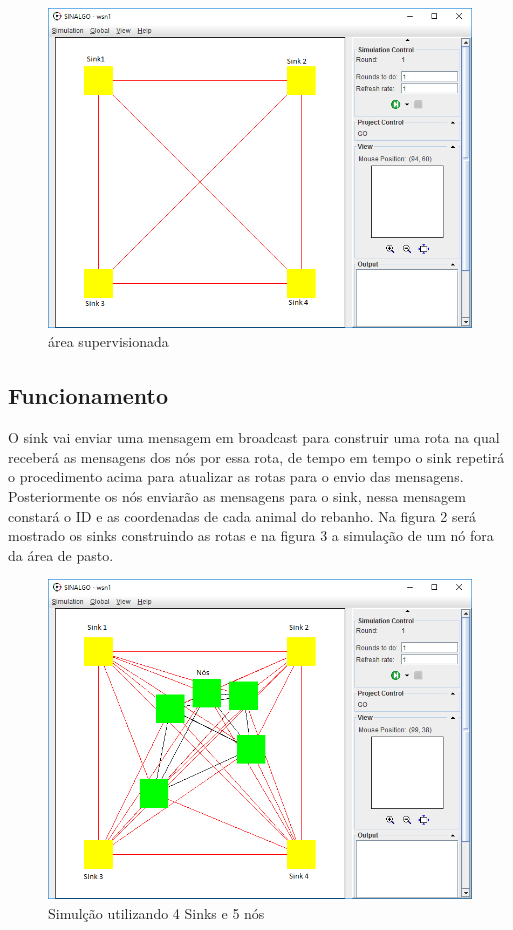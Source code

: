 \documentclass[12pt]{article}
\begin{document}
\begin{figure}[ht]
	\centering
	\includegraphics[scale=0.6]{Limite.png}
	\caption{área supervisionada}
	\label{Limite}
\end{figure}
\FloatBarrier 

\subsection{Funcionamento}

O sink vai enviar uma mensagem em broadcast para construir uma rota na qual receberá as mensagens dos nós por essa rota, de tempo em tempo o sink repetirá o procedimento acima para atualizar as rotas para o envio das mensagens. Posteriormente os nós enviarão as mensagens para o sink, nessa mensagem constará o ID e as coordenadas de cada animal do rebanho. Na figura 2 será mostrado os sinks construindo as rotas e na figura 3 a simulação de um nó fora da área de pasto.

\begin{figure}[ht]
	\centering
	\includegraphics[scale=0.6]{simulacao.png}
	\caption{Simulção utilizando 4 Sinks e 5 nós}
	\label{simulacao}
\end{figure}
\FloatBarrier 
\end{document}

